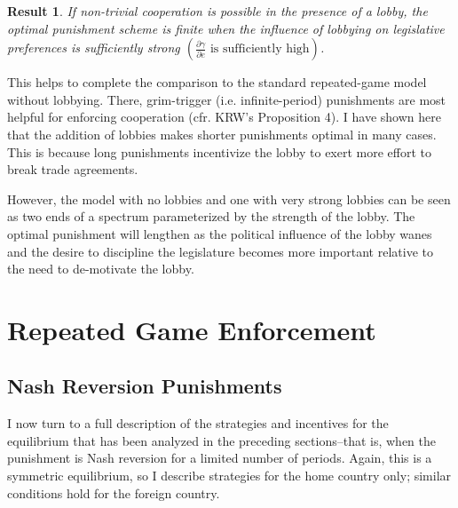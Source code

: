 \documentclass[authoryear, review]{elsarticle}
\newtheorem{result}{Result}
\newcommand{\ga}{\gamma}
\begin{document}
\begin{result}
  If non-trivial cooperation is possible in the presence of a lobby, the optimal punishment scheme is finite when the influence of lobbying on legislative preferences is sufficiently strong $\left(\frac{\partial \ga}{\partial e}\text{ is sufficiently high}\right)$.
\end{result}

This helps to complete the comparison to the standard repeated-game model without lobbying. There, grim-trigger (i.e. infinite-period) punishments are most helpful for enforcing cooperation (cfr. KRW's Proposition 4). I have shown here that the addition of lobbies makes shorter punishments optimal in many cases. This is because long punishments incentivize the lobby to exert more effort to break trade agreements.

However, the model with no lobbies and one with very strong lobbies can be seen as two ends of a spectrum parameterized by the strength of the lobby. The optimal punishment will lengthen as the political influence of the lobby wanes and the desire to discipline the legislature becomes more important relative to the need to de-motivate the lobby.







\section{Repeated Game Enforcement}
\label{sec:repeated2}

\subsection{Nash Reversion Punishments}
\label{sec:nashrev}
I now turn to a full description of the strategies and incentives for the equilibrium that has been analyzed in the preceding sections--that is, when the punishment is Nash reversion for a limited number of periods. Again, this is a symmetric equilibrium, so I describe strategies for the home country only; similar conditions hold for the foreign country.
\end{document}
